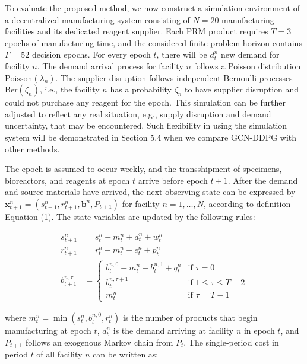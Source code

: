 \documentclass[preprint,review,12pt,nonatbib]{elsarticle}
\begin{document}
To evaluate the proposed method, we now construct a simulation environment of a decentralized manufacturing system consisting of $N=20$ manufacturing facilities and its dedicated reagent supplier. Each PRM product requires $T=3$ epochs of manufacturing time, and the considered finite problem horizon contains $\Gamma=52$ decision epochs. For every epoch $t$, there will be $d_{t}^{n}$ new demand for facility $n$. The demand arrival process for facility $n$ follows a Poisson distribution $\text{Poisson}\left(\lambda_{n}\right)$. The supplier disruption follows independent Bernoulli processes $\text{Ber}\left(\zeta_{n}\right)$, i.e., the facility $n$ has a probability $\zeta_{n}$ to have supplier disruption and could not purchase any reagent for the epoch. This simulation can be further adjusted to reflect any real situation, e.g., supply disruption and demand uncertainty, that may be encountered. Such flexibility in using the simulation system will be demonstrated in Section 5.4 when we compare GCN-DDPG with other methods.

The epoch is assumed to occur weekly, and the transshipment of specimens, bioreactors, and reagents at epoch $t$ arrive before epoch $t+1$. After the demand and source materials have arrived, the next observing state can be expressed by $\mathbf{x}_{t+1}^{n}=\left(s_{t+1}^{n}, r_{t+1}^{n}, \mathbf{b}^{n}, P_{t+1}\right)$ for facility $n=1, \ldots, N$, according to definition Equation (1). The state variables are updated by the following rules:

\begin{align*}
s_{t+1}^{n}&=s_{t}^{n}-m_{t}^{n}+d_{t}^{n}+w_{t}^{n} \\
r_{t+1}^{n}&=r_{t}^{n}-m_{t}^{n}+e_{t}^{n}+p_{t}^{n} \\
b_{t+1}^{n, \tau}&= \begin{cases}
b_{t}^{n, 0}-m_{t}^{n}+b_{t}^{n, 1}+q_{t}^{n} & \text{if } \tau=0 \\
b_{t}^{n, \tau+1} & \text{if } 1 \leq \tau \leq T-2 \\
m_{t}^{n} & \text{if } \tau=T-1
\end{cases}
\end{align*}

where $m_{t}^{n}=\min \left(s_{t}^{n}, b_{t}^{n, 0}, r_{t}^{n}\right)$ is the number of products that begin manufacturing at epoch $t$, $d_{t}^{n}$ is the demand arriving at facility $n$ in epoch $t$, and $P_{t+1}$ follows an exogenous Markov chain from $P_{t}$. The single-period cost in period $t$ of all facility $n$ can be written as:
\end{document}
